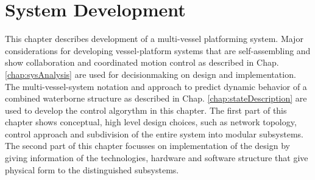 \chapter{System Development}
\label{chap:sysDevelopent}
This chapter describes development of a multi-vessel platforming system. Major considerations for developing vessel-platform systems that are self-assembling and show collaboration and coordinated motion control as described in Chap. \ref{chap:sysAnalysis} are used for decisionmaking on design and implementation. The multi-vessel-system notation and approach to predict dynamic behavior of a combined waterborne structure as described in Chap. \ref{chap:stateDescription} are used to develop the control algorythm in this chapter. 
The first part of this chapter shows conceptual, high level design choices, such as network topology, control approach and subdivision of the entire system into modular subsystems. 
The second part of this chapter focusses on implementation of the design by giving information of the  technologies, hardware and software structure that give physical form to the distinguished subsystems. 


